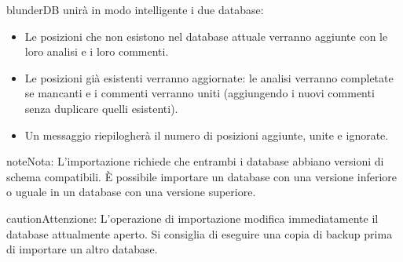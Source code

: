 \documentclass[letterpaper,10pt,italian]{sphinxmanual}
\begin{document}
\sphinxAtStartPar
blunderDB unirà in modo intelligente i due database:
\begin{itemize}
\item {} 
\sphinxAtStartPar
Le posizioni che non esistono nel database attuale verranno aggiunte con le loro analisi e i loro commenti.

\item {} 
\sphinxAtStartPar
Le posizioni già esistenti verranno aggiornate: le analisi verranno completate se mancanti e i commenti verranno uniti (aggiungendo i nuovi commenti senza duplicare quelli esistenti).

\item {} 
\sphinxAtStartPar
Un messaggio riepilogherà il numero di posizioni aggiunte, unite e ignorate.

\end{itemize}

\begin{sphinxadmonition}{note}{Nota:}
\sphinxAtStartPar
L’importazione richiede che entrambi i database abbiano versioni di schema compatibili. È possibile importare un database con una versione inferiore o uguale in un database con una versione superiore.
\end{sphinxadmonition}

\begin{sphinxadmonition}{caution}{Attenzione:}
\sphinxAtStartPar
L’operazione di importazione modifica immediatamente il database attualmente aperto. Si consiglia di eseguire una copia di backup prima di importare un altro database.
\end{sphinxadmonition}
\end{document}
